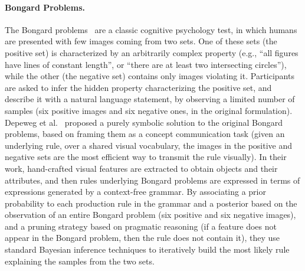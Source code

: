 \fi

\paragraph{Bongard Problems.}
The Bongard problems~\cite{bongard1970pattern} are a classic cognitive psychology test, in which humans are presented with few images coming from two sets. One of these sets (the positive set) is characterized by an arbitrarily complex property (e.g., ``all figures have lines of constant length'', or ``there are at least two intersecting circles''), while the other (the negative set) contains only images violating it.
Participants are asked to infer the hidden property characterizing the positive set, and describe it with a natural language statement, by observing a limited number of samples (six positive images and six negative ones, in the original formulation).
%
Depeweg et al.~\cite{depeweg2018solving} proposed a purely symbolic solution to the original Bongard problems, based on framing them as a concept communication task (given an underlying rule, over a shared visual vocabulary, the images in the positive and negative sets are the most efficient way to transmit the rule visually). In their work, hand-crafted visual features are extracted to obtain objects and their attributes, and then rules underlying Bongard problems are expressed in terms of expressions generated by a context-free grammar.
By associating a prior probability to each production rule in the grammar and a posterior based on the observation of an entire Bongard problem (six positive and six negative images), and a pruning strategy based on pragmatic reasoning (if a feature does not appear in the Bongard problem, then the rule does not contain it), they use standard Bayesian inference techniques to iteratively build the most likely rule explaining the samples from the two sets.


